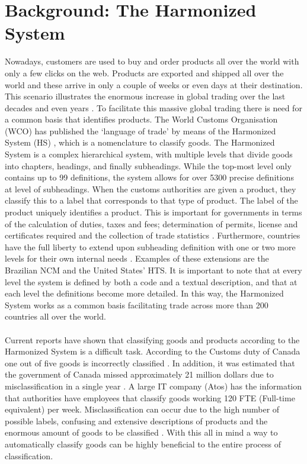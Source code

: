 \section{Background: The Harmonized System}
Nowadays, customers are used to buy and order products all over the world with only a few clicks on the web. Products are exported and shipped all over the world and these arrive in only a couple of weeks or even days at their destination. This scenario illustrates the enormous increase in global trading over the last decades \cite{EstebanOrtiz-Ospina2018} and even years \cite{World-Trade-Statistical-2018}. To facilitate this massive global trading there is need for a common basis that identifies products. The World Customs Organisation (WCO) has published the ‘language of trade’ by means of the Harmonized System (HS) \cite{GeneralSecretariatoftheWorldCustomsOrganisationWCO1983, Chan2015} , which is a nomenclature to classify goods. The Harmonized System is a complex hierarchical system, with multiple levels that divide goods into chapters, headings, and finally subheadings. While the top-most level only contains up to 99 definitions, the system allows for over 5300 precise definitions at level of subheadings. When the customs authorities are given a product, they classify this to a label that corresponds to that type of product. The label of the product uniquely identifies a product. This is important for governments in terms of the calculation of duties, taxes and fees; determination of permits, license and certificates required and the collection of trade statistics \cite{Ding2015}. Furthermore, countries have the full liberty to extend upon subheading definition with one or two more levels for their own internal needs \cite{Weerth2008}. Examples of these extensions are the Brazilian NCM and the United States’ HTS. It is important to note that at every level the system is defined by both a code and a textual description, and that at each level the definitions become more detailed. In this way, the Harmonized System works as a common basis facilitating trade across more than 200 countries all over the world.\\
\\
Current reports have shown that classifying goods and products according to the Harmonized System is a difficult task. According to the Customs duty of Canada one out of five goods is incorrectly classified \cite{AuditorGeneralofCanada2017}. In addition, it was estimated that the government of Canada missed approximately 21 million dollars due to misclassification in a single year \cite{AuditorGeneralofCanada2017}. A large IT company (Atos) has the information that authorities have employees that classify goods working 120 FTE (Full-time equivalent) per week. Misclassification can occur due to the high number of possible labels, confusing and extensive descriptions of products and the enormous amount of goods to be classified \cite{Kappler2011a}. With this all in mind a way to automatically classify goods can be highly beneficial to the entire process of classification.\\
